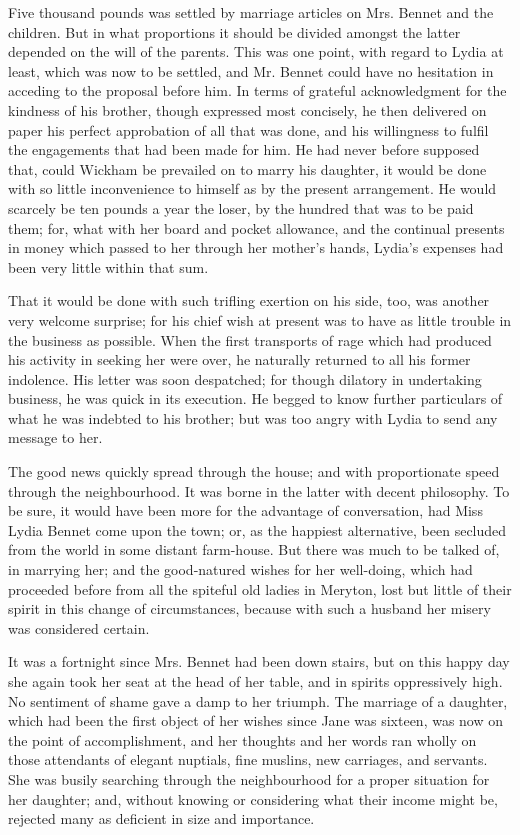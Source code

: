 \documentclass[10pt]{book}
\begin{document}
   Five thousand pounds was settled by marriage articles on Mrs. Bennet and
the children. But in what proportions it should be divided amongst the
latter depended on the will of the parents. This was one point, with
regard to Lydia at least, which was now to be settled, and Mr. Bennet
could have no hesitation in acceding to the proposal before him. In
terms of grateful acknowledgment for the kindness of his brother, though
expressed most concisely, he then delivered on paper his perfect
approbation of all that was done, and his willingness to fulfil the
engagements that had been made for him. He had never before supposed
that, could Wickham be prevailed on to marry his daughter, it would be
done with so little inconvenience to himself as by the present
   arrangement. He would scarcely be ten pounds a year the loser, by the
hundred that was to be paid them; for, what with her board and pocket
allowance, and the continual presents in money which passed to her
through her mother’s hands, Lydia’s expenses had been very little within
that sum.
  

   That it would be done with such trifling exertion on his side, too, was
another very welcome surprise; for his chief wish at present was to have
as little trouble in the business as possible. When the first transports
of rage which had produced his activity in seeking her were over, he
naturally returned to all his former indolence. His letter was soon
despatched; for though dilatory in undertaking business, he was quick in
its execution. He begged to know further particulars of what he was
indebted to his brother; but was too angry with Lydia to send any
message to her.
  

   The good news quickly spread through the house; and with proportionate
speed through the neighbourhood. It was borne in the latter with decent
philosophy. To be sure, it would have been more for the advantage of
conversation, had Miss Lydia Bennet come upon the town; or, as the
happiest alternative, been secluded from the world in some distant
farm-house. But there was much to be talked of, in marrying her; and the
good-natured wishes for her well-doing, which had proceeded before from
all the spiteful old ladies in Meryton, lost but little of their spirit
in this change of circumstances, because with such a husband her misery
was considered certain.
  

   It was a fortnight since Mrs. Bennet had been down stairs, but on this
happy day she again took her seat at the head of her table, and in
spirits oppressively high. No sentiment of shame gave a damp to her
triumph.
   The marriage of a daughter, which had been the first object of
her wishes since Jane was sixteen, was now on the point of
accomplishment, and her thoughts and her words ran wholly on those
attendants of elegant nuptials, fine muslins, new carriages, and
servants. She was busily searching through the neighbourhood for a
proper situation for her daughter; and, without knowing or considering
what their income might be, rejected many as deficient in size and
importance.
  
\end{document}
